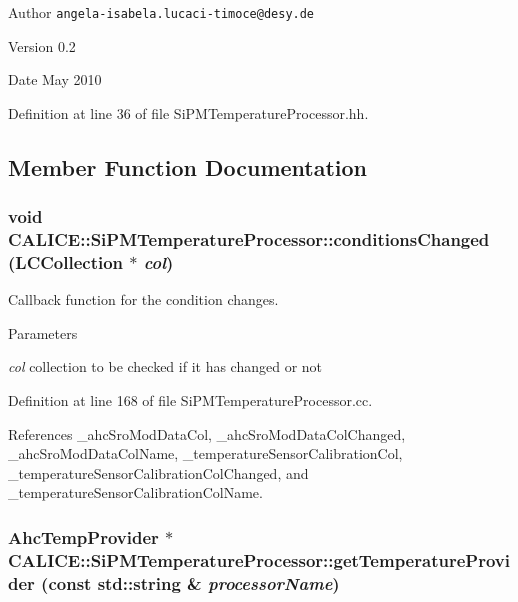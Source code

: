 \begin{DoxyAuthor}{Author}
{\tt angela-\/isabela.lucaci-\/timoce@desy.de} 
\end{DoxyAuthor}
\begin{DoxyVersion}{Version}
0.2 
\end{DoxyVersion}
\begin{DoxyDate}{Date}
May 2010 
\end{DoxyDate}


Definition at line 36 of file SiPMTemperatureProcessor.hh.

\subsection{Member Function Documentation}
\subsubsection[{conditionsChanged}]{\setlength{\rightskip}{0pt plus 5cm}void CALICE::SiPMTemperatureProcessor::conditionsChanged (LCCollection $\ast$ {\em col})\hspace{0.3cm}{\ttfamily  [virtual]}}\label{classCALICE_1_1SiPMTemperatureProcessor_a05aa832ece6bc5253418e56db9e79cf7}


Callback function for the condition changes. 
\begin{DoxyParams}{Parameters}
\item[{\em col}]collection to be checked if it has changed or not \end{DoxyParams}


Definition at line 168 of file SiPMTemperatureProcessor.cc.

References \_\-ahcSroModDataCol, \_\-ahcSroModDataColChanged, \_\-ahcSroModDataColName, \_\-temperatureSensorCalibrationCol, \_\-temperatureSensorCalibrationColChanged, and \_\-temperatureSensorCalibrationColName.
\subsubsection[{getTemperatureProvider}]{\setlength{\rightskip}{0pt plus 5cm}AhcTempProvider $\ast$ CALICE::SiPMTemperatureProcessor::getTemperatureProvider (const std::string \& {\em processorName})\hspace{0.3cm}{\ttfamily  [static]}}\label{classCALICE_1_1SiPMTemperatureProcessor_ae53699ce851320ce9b964a49f54da2c9}


